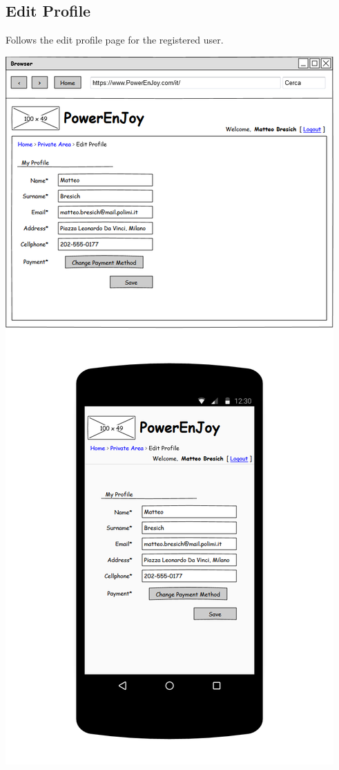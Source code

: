 \subsection{Edit Profile} Follows the edit profile page for the registered user.
\begin{center}
	\includegraphics[width=0.6\linewidth]{"img/ui/edit-profile"}
\end{center}
\pagebreak